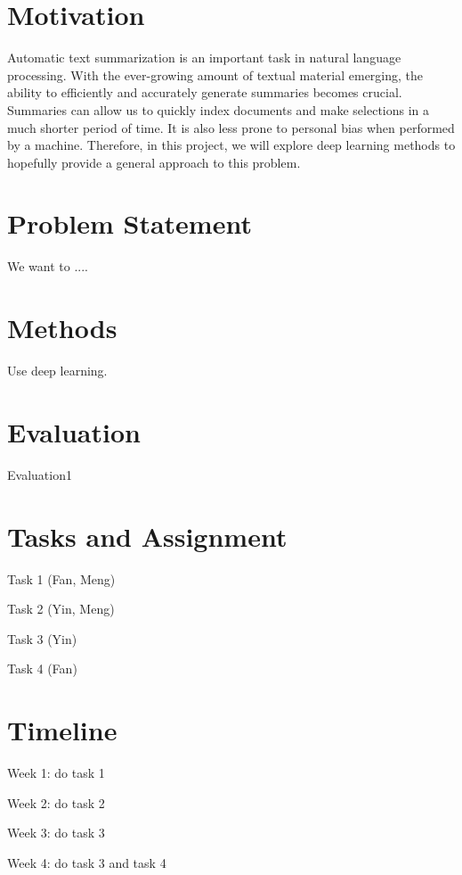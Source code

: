 \section{Motivation}
Automatic text summarization is an important task in natural language processing. With the ever-growing amount of textual material emerging, the ability to efficiently and accurately generate summaries becomes crucial. Summaries can allow us to quickly index documents and make selections in a much shorter period of time. It is also less prone to personal bias when performed by a machine. Therefore, in this project, we will explore deep learning methods to hopefully provide a general approach to this problem.

\section{Problem Statement}

We want to ....

\section{Methods}
\begin{compactitem}
\item Use deep learning. 
\end{compactitem}



\section{Evaluation}
\begin{compactitem}
\item Evaluation1
\end{compactitem}

\section{Tasks and Assignment}

\begin{compactitem}
\item Task 1 (Fan, Meng)
\item Task 2 (Yin, Meng)
\item Task 3 (Yin)
\item Task 4 (Fan)
\end{compactitem}


\section{Timeline}
\begin{compactitem}
\item Week 1: do task 1
\item Week 2: do task 2
\item Week 3: do task 3
\item Week 4: do task 3 and task 4
\end{compactitem}



